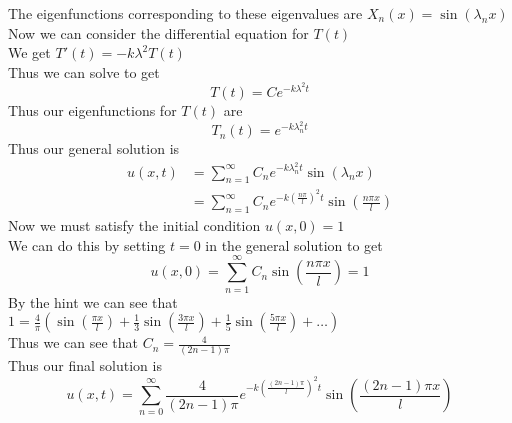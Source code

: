 \documentclass[answers,12pt,addpoints]{exam}
\begin{document}
\begin{questions}
    The eigenfunctions corresponding to these eigenvalues are $X_n(x) = \sin(\lambda_n x)$\\
    Now we can consider the differential equation for $T(t)$\\
    We get $T'(t) = -k\lambda^2 T(t)$\\
    Thus we can solve to get 
    $$T(t) = C e^{-k \lambda^2 t} $$
    Thus our eigenfunctions for $T(t)$ are 
    $$ T_n(t) = e^{-k \lambda_n^2 t}$$
    Thus our general solution is
    \begin{align*}
        u(x,t) &= \sum_{n=1}^{\infty} C_n e^{-k \lambda_n^2 t} \sin(\lambda_n x)\\
        &= \sum_{n=1}^{\infty} C_n e^{-k \left(\frac{n\pi}{l}\right)^2 t} \sin\left(\frac{n\pi x}{l}\right)
    \end{align*}
    Now we must satisfy the initial condition $u(x,0) = 1$\\
    We can do this by setting $t = 0$ in the general solution to get
    $$ u(x,0) = \sum_{n=1}^{\infty} C_n \sin\left(\frac{n\pi x}{l}\right) = 1$$
    By the hint we can see that $1 = \frac{4}{\pi}\left( \sin(\frac{\pi x}{l})+ \frac{1}{3}\sin(\frac{3\pi x}{l}) + \frac{1}{5}\sin(\frac{5\pi x}{l}) + \dots \right) $\\
    Thus we can see that $C_n = \frac{4}{(2n-1)\pi}$\\
    Thus our final solution is
    $$ u(x,t) = \sum_{n=0}^\infty \frac{4}{(2n-1)\pi} e^{-k \left(\frac{(2n-1)\pi}{l}\right)^2 t} \sin\left(\frac{(2n-1)\pi x}{l}\right)$$



\end{questions}
\end{document}
